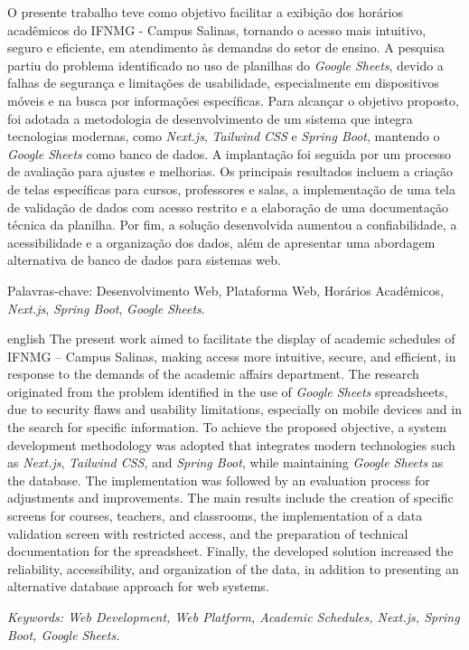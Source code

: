 \documentclass[
	12pt,				%
	twoside,			%
	a4paper,			%
	chapter=TITLE,		%
	section=TITLE,		%
	subsection=TITLE,	%
	subsubsection=TITLE,%
	english,			%
	french,				%
	spanish,			%
	brazil,				%
	]{abntex2}
\begin{document}
\begin{resumo}
	O presente trabalho teve como objetivo facilitar a exibição dos horários acadêmicos do IFNMG - Campus Salinas, tornando o acesso mais intuitivo, seguro e eficiente, em atendimento às demandas do setor de ensino. A pesquisa partiu do problema identificado no uso de planilhas do \textit{Google Sheets}, devido a falhas de segurança e limitações de usabilidade, especialmente em dispositivos móveis e na busca por informações específicas. Para alcançar o objetivo proposto, foi adotada a metodologia de desenvolvimento de um sistema que integra tecnologias modernas, como \textit{Next.js}, \textit{Tailwind CSS} e \textit{Spring Boot}, mantendo o \textit{Google Sheets} como banco de dados. A implantação foi seguida por um processo de avaliação para ajustes e melhorias. Os principais resultados incluem a criação de telas específicas para cursos, professores e salas, a implementação de uma tela de validação de dados com acesso restrito e a elaboração de uma documentação técnica da planilha. Por fim, a solução desenvolvida aumentou a confiabilidade, a acessibilidade e a organização dos dados, além de apresentar uma abordagem alternativa de banco de dados para sistemas web.
    
    Palavras-chave: Desenvolvimento Web, Plataforma Web, Horários Acadêmicos,
	\textit{Next.js}, \textit{Spring Boot}, \textit{Google Sheets}.
\end{resumo}

\begin{resumo}[Abstract]
    \begin{otherlanguage*}{english}
        The present work aimed to facilitate the display of academic schedules of IFNMG – Campus Salinas, making access more intuitive, secure, and efficient, in response to the demands of the academic affairs department. The research originated from the problem identified in the use of \textit{Google Sheets} spreadsheets, due to security flaws and usability limitations, especially on mobile devices and in the search for specific information. To achieve the proposed objective, a system development methodology was adopted that integrates modern technologies such as \textit{Next.js}, \textit{Tailwind CSS}, and \textit{Spring Boot}, while maintaining \textit{Google Sheets} as the database. The implementation was followed by an evaluation process for adjustments and improvements. The main results include the creation of specific screens for courses, teachers, and classrooms, the implementation of a data validation screen with restricted access, and the preparation of technical documentation for the spreadsheet. Finally, the developed solution increased the reliability, accessibility, and organization of the data, in addition to presenting an alternative database approach for web systems.

        \textit{Keywords: Web Development, Web Platform, Academic Schedules, Next.js, Spring Boot, Google Sheets.}
    \end{otherlanguage*}
\end{resumo}
\end{document}
